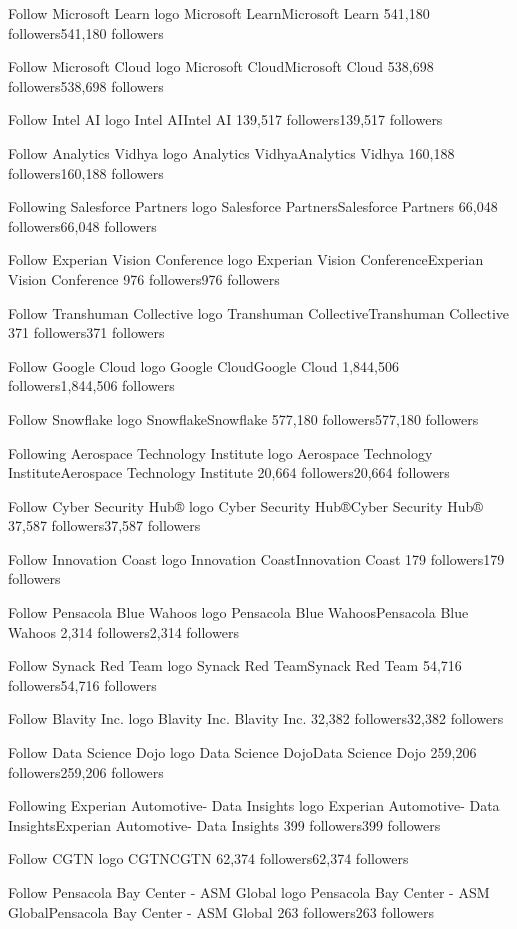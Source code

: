 Follow
Microsoft Learn logo
Microsoft LearnMicrosoft Learn
541,180 followers541,180 followers

Follow
Microsoft Cloud logo
Microsoft CloudMicrosoft Cloud
538,698 followers538,698 followers

Follow
Intel AI logo
Intel AIIntel AI
139,517 followers139,517 followers

Follow
Analytics Vidhya logo
Analytics VidhyaAnalytics Vidhya
160,188 followers160,188 followers

Following
Salesforce Partners logo
Salesforce PartnersSalesforce Partners
66,048 followers66,048 followers

Follow
Experian Vision Conference logo
Experian Vision ConferenceExperian Vision Conference
976 followers976 followers

Follow
Transhuman Collective logo
Transhuman CollectiveTranshuman Collective
371 followers371 followers

Follow
Google Cloud logo
Google CloudGoogle Cloud
1,844,506 followers1,844,506 followers

Follow
Snowflake logo
SnowflakeSnowflake
577,180 followers577,180 followers

Following
Aerospace Technology Institute logo
Aerospace Technology InstituteAerospace Technology Institute
20,664 followers20,664 followers

Follow
Cyber Security Hub® logo
Cyber Security Hub®Cyber Security Hub®
37,587 followers37,587 followers

Follow
Innovation Coast logo
Innovation CoastInnovation Coast
179 followers179 followers

Follow
Pensacola Blue Wahoos logo
Pensacola Blue WahoosPensacola Blue Wahoos
2,314 followers2,314 followers

Follow
Synack Red Team logo
Synack Red TeamSynack Red Team
54,716 followers54,716 followers

Follow
Blavity Inc.  logo
Blavity Inc. Blavity Inc. 
32,382 followers32,382 followers

Follow
Data Science Dojo logo
Data Science DojoData Science Dojo
259,206 followers259,206 followers

Following
Experian Automotive- Data Insights logo
Experian Automotive- Data InsightsExperian Automotive- Data Insights
399 followers399 followers

Follow
CGTN logo
CGTNCGTN
62,374 followers62,374 followers

Follow
Pensacola Bay Center - ASM Global logo
Pensacola Bay Center - ASM GlobalPensacola Bay Center - ASM Global
263 followers263 followers

